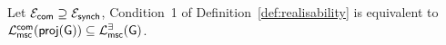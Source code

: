 \begin{proposition}%
    \label{prop:msc-version-of-cond1-of-realizability}
    Let $\mathcal{E}_{\mathsf{com}}\supseteq\mathcal{E}_{\mathsf{synch}}$, 
   Condition~1 of Definition~\ref{def:realisability} is equivalent to
    $\mathcal{L}_{\mathsf{msc}}^{\mathsf{com}}(\mathsf{proj}(\mathsf{G})) \subseteq \mathcal{L}_{\mathsf{msc}}^{\exists}(\mathsf{G})$.
\end{proposition}
    



